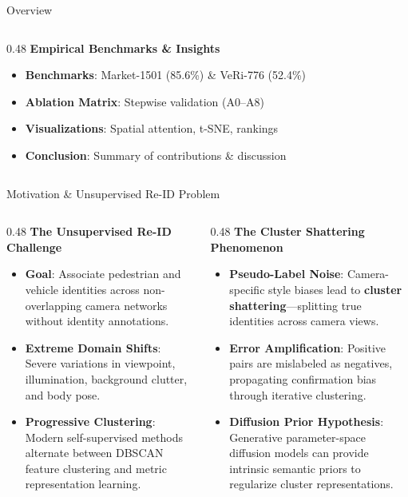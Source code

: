 \documentclass[aspectratio=169,xcolor=dvipsnames]{beamer}
\begin{document}
\begin{frame}{Overview}
\begin{columns}[t,onlytextwidth]
\begin{column}{0.48\textwidth}
    \vspace{0.2em}
    \textbf{Empirical Benchmarks \& Insights}
    \begin{itemize}
        \setlength{\itemsep}{0.08em}
        \item \textbf{Benchmarks}: Market-1501 (85.6\%) \& VeRi-776 (52.4\%)
        \item \textbf{Ablation Matrix}: Stepwise validation (A0--A8)
        \item \textbf{Visualizations}: Spatial attention, t-SNE, rankings
        \item \textbf{Conclusion}: Summary of contributions \& discussion
    \end{itemize}
\end{column}
\end{columns}
\end{frame}

\begin{frame}{Motivation \& Unsupervised Re-ID Problem}
\footnotesize
\begin{columns}[t,onlytextwidth]
\begin{column}{0.48\textwidth}
    \textbf{The Unsupervised Re-ID Challenge}
    \begin{itemize}
        \setlength{\itemsep}{0.3em}
        \item \textbf{Goal}: Associate pedestrian and vehicle identities across non-overlapping camera networks without identity annotations.
        \item \textbf{Extreme Domain Shifts}: Severe variations in viewpoint, illumination, background clutter, and body pose.
        \item \textbf{Progressive Clustering}: Modern self-supervised methods alternate between DBSCAN feature clustering and metric representation learning.
    \end{itemize}
\end{column}
\begin{column}{0.48\textwidth}
    \textbf{The Cluster Shattering Phenomenon}
    \begin{itemize}
        \setlength{\itemsep}{0.3em}
        \item \textbf{Pseudo-Label Noise}: Camera-specific style biases lead to \textbf{cluster shattering}---splitting true identities across camera views.
        \item \textbf{Error Amplification}: Positive pairs are mislabeled as negatives, propagating confirmation bias through iterative clustering.
        \item \textbf{Diffusion Prior Hypothesis}: Generative parameter-space diffusion models can provide intrinsic semantic priors to regularize cluster representations.
    \end{itemize}
\end{column}
\end{columns}
\end{frame}
\end{document}
